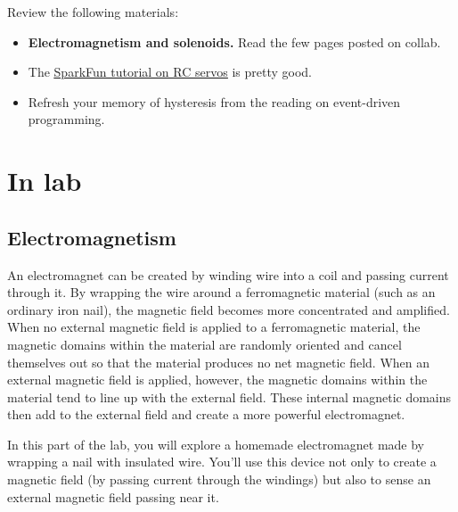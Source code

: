 \documentclass[11pt]{article} %
\begin{document}
Review the following materials:
\begin{itemize}
\item {\bf Electromagnetism and solenoids.} Read the few pages posted on collab.
\item The \href{https://learn.sparkfun.com/tutorials/hobby-servo-tutorial}{\underline{SparkFun tutorial on RC servos}} is pretty good.
\item Refresh your memory of hysteresis from the reading on event-driven programming.
\end{itemize}

\section*{In lab}

\subsection*{Electromagnetism}

An electromagnet can be created by winding wire into a coil and passing current through it. By wrapping the wire around a ferromagnetic material (such as an ordinary iron nail), the magnetic field becomes more concentrated and amplified. When no external magnetic field is applied to a ferromagnetic material, the magnetic domains within the material are randomly oriented and cancel themselves out so that the material produces no net magnetic field. When an external magnetic field is applied, however, the magnetic domains within the material tend to line up with the external field. These internal magnetic domains then add to the external field and create a more powerful electromagnet.

In this part of the lab, you will explore a homemade electromagnet made by wrapping a nail with insulated wire. You’ll use this device not only to create a magnetic field (by passing current through the windings) but also to sense an external magnetic field passing near it.
\end{document}
